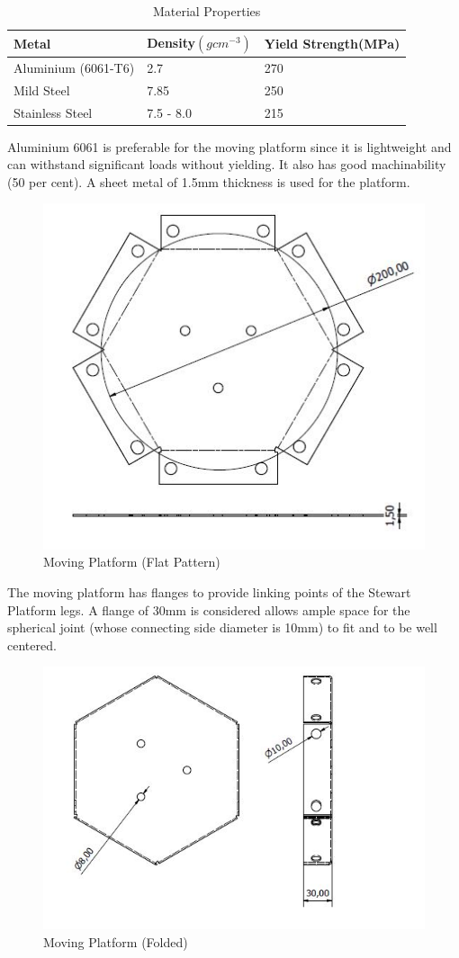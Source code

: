 \begin{center}
\begin{table}[!h]
	\caption[Sheet Metal Properties]{Material Properties}
	\label{table1}
\centering
\begin{tabular}{|l|l|l|}
\hline
\textbf{Metal} & \textbf{Density$(gcm^{-3})$} & \textbf{Yield Strength(MPa)}\\
\hline
Aluminium (6061-T6)& 2.7 & 270\\
\hline
Mild Steel & 7.85 & 250\\
\hline
Stainless Steel & 7.5 - 8.0 & 215\\
\hline
\end{tabular}
\end{table}
\end{center}
Aluminium 6061 is preferable for the moving platform since it is lightweight and can withstand significant loads without yielding. It also has good machinability (50 per cent). A sheet metal of 1.5mm thickness is used for the platform.
\begin{center}
	\begin{figure}[H]
	\centering
	\includegraphics[width=0.6\linewidth]{Figures/Flat}
	\caption[Moving Platform]{Moving Platform (Flat Pattern)}
	\end{figure}
\end{center}

The moving platform has flanges to provide linking points of the Stewart Platform legs. A flange of 30mm is considered allows ample space for the spherical joint (whose connecting side diameter is 10mm) to fit and to be well centered.
\begin{center}
	\begin{figure}[H]
	\centering
	\includegraphics[width=0.6\linewidth]{Figures/Folded}
	\caption[Moving Platform]{Moving Platform (Folded)}
	\end{figure}
\end{center}

